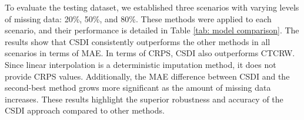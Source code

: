 \documentclass[11pt]{article}
\begin{document}
To evaluate the testing dataset, we established three scenarios with varying levels of missing data: 20\%, 50\%, and 80\%. These methods were applied to each scenario, and their performance is detailed in Table \ref{tab: model comparison}. The results show that CSDI consistently outperforms the other methods in all scenarios in terms of MAE. In terms of CRPS, CSDI also outperforms CTCRW. Since linear interpolation is a deterministic imputation method, it does not provide CRPS values. Additionally, the MAE difference between CSDI and the second-best method grows more significant as the amount of missing data increases. These results highlight the superior robustness and accuracy of the CSDI approach compared to other methods.





\end{document}
